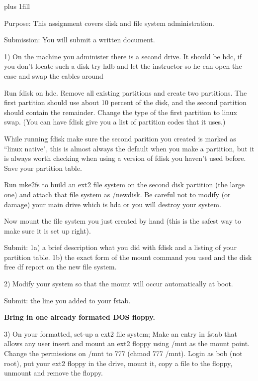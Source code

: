 
\rightskip=0pt plus 1fill

\parindent 0pt

Purpose: This assignment covers disk and file system administration.

Submission: You will submit a written document.

1) On the machine you administer there is a second drive.
It should be {\ltt{}hdc}, if you don't locate such a disk
try {\ltt{}hdb} and let the instructor so he can
open the case and swap the cables around

Run {\ltt{}fdisk} on {\ltt{}hdc}.
Remove all existing partitions and create two partitions.
The first partition should use about 10 percent of the
disk, and the second partition should contain the remainder.
Change the type of the first partition to linux swap.
(You can have {\ltt{}fdisk} give you a list of partition codes that it uses.)

While running {\ltt{}fdisk} make sure the second parition
you created is marked as ``linux native", this is almost always the
default when you make a partition, but it is always worth checking
when using a version of {\ltt{}fdisk} you haven't used before.
Save your partition table.

Run {\ltt{}mke2fs} to build 
an ext2 file system on the second disk partition (the large
one) and attach that file system as {\ltt{}/newdisk}.
Be careful not to modify (or damage) your main drive
which is {\ltt{}hda} or you will destroy your system.

Now mount the file system you just created by hand
(this is the safest way to make sure it is set up right).

Submit: 
1a) a brief description what you did with {\ltt{}fdisk} and
a listing of your partition table.
1b) the exact form of the {\ltt{}mount} command you used and
the disk free {\ltt{}df} report on the new file system.

2) Modify your system so that the mount will 
occur automatically at boot.

Submit: the line you added to your {\ltt{}fstab}.

{\bf Bring in one already formated DOS floppy.}

3) On your formatted, set-up a ext2 file system;
Make an entry in {\ltt{}fstab} that allows any user insert and 
mount an ext2 floppy using {\ltt{}/mnt} as the mount point.
Change the permissions on {\ltt{}/mnt} to 777 ({\ltt{}chmod 777 /mnt}).
Login as bob (not root), put your ext2 floppy
in the drive,
mount it, copy a file to the floppy, unmount and remove the floppy.

